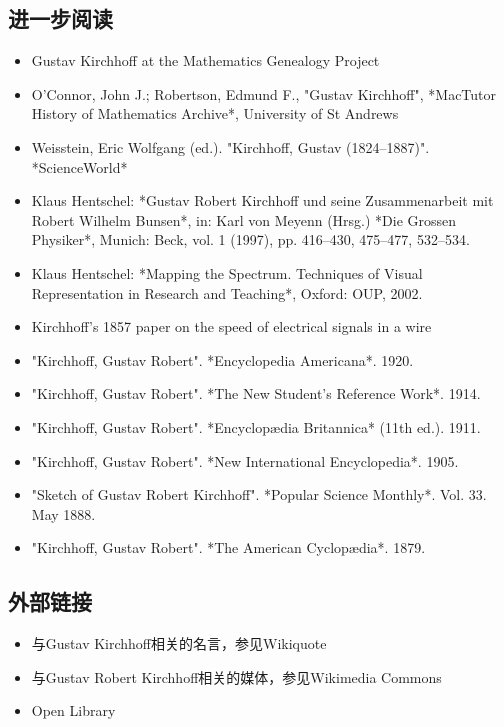 \subsection{进一步阅读}  
\begin{itemize}
\item Gustav Kirchhoff at the Mathematics Genealogy Project  
\item O'Connor, John J.; Robertson, Edmund F., "Gustav Kirchhoff", *MacTutor History of Mathematics Archive*, University of St Andrews  
\item Weisstein, Eric Wolfgang (ed.). "Kirchhoff, Gustav (1824–1887)". *ScienceWorld*  
\item Klaus Hentschel: *Gustav Robert Kirchhoff und seine Zusammenarbeit mit Robert Wilhelm Bunsen*, in: Karl von Meyenn (Hrsg.) *Die Grossen Physiker*, Munich: Beck, vol. 1 (1997), pp. 416–430, 475–477, 532–534.  
\item Klaus Hentschel: *Mapping the Spectrum. Techniques of Visual Representation in Research and Teaching*, Oxford: OUP, 2002.  
\item Kirchhoff's 1857 paper on the speed of electrical signals in a wire 
\end{itemize} 
\begin{itemize}
\item "Kirchhoff, Gustav Robert". *Encyclopedia Americana*. 1920.  
\item "Kirchhoff, Gustav Robert". *The New Student's Reference Work*. 1914.  
\item "Kirchhoff, Gustav Robert". *Encyclopædia Britannica* (11th ed.). 1911.  
\item "Kirchhoff, Gustav Robert". *New International Encyclopedia*. 1905.  
\item "Sketch of Gustav Robert Kirchhoff". *Popular Science Monthly*. Vol. 33. May 1888.  
\item "Kirchhoff, Gustav Robert". *The American Cyclopædia*. 1879. 
\end{itemize} 
\subsection{外部链接}  
\begin{itemize}
\item 与Gustav Kirchhoff相关的名言，参见Wikiquote 
\item 与Gustav Robert Kirchhoff相关的媒体，参见Wikimedia Commons  
\item Open Library
\end{itemize} 
